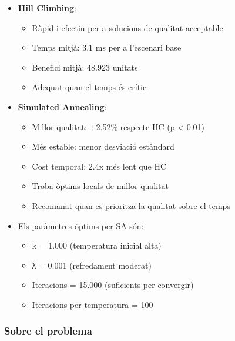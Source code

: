 \begin{itemize}
    \item \textbf{Hill Climbing}:
    \begin{itemize}
        \item Ràpid i efectiu per a solucions de qualitat acceptable
        \item Temps mitjà: 3.1 ms per a l'escenari base
        \item Benefici mitjà: 48.923 unitats
        \item Adequat quan el temps és crític
    \end{itemize}
    
    \item \textbf{Simulated Annealing}:
    \begin{itemize}
        \item Millor qualitat: +2.52\% respecte HC (p < 0.01)
        \item Més estable: menor desviació estàndard
        \item Cost temporal: 2.4x més lent que HC
        \item Troba òptims locals de millor qualitat
        \item Recomanat quan es prioritza la qualitat sobre el temps
    \end{itemize}
    
    \item Els paràmetres òptims per SA són:
    \begin{itemize}
        \item k = 1.000 (temperatura inicial alta)
        \item λ = 0.001 (refredament moderat)
        \item Iteracions = 15.000 (suficients per convergir)
        \item Iteracions per temperatura = 100
    \end{itemize}
\end{itemize}

\subsubsection{Sobre el problema}

